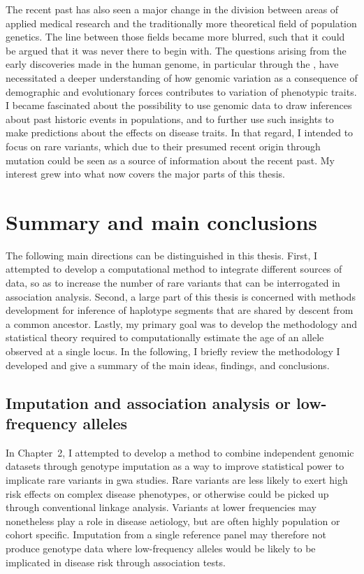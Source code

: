 The recent past has also seen a major change in the division between areas of applied medical research and the traditionally more theoretical field of population genetics.
The line between those fields became more blurred, such that it could be argued that it was never there to begin with.
The questions arising from the early discoveries made in the human genome, in particular through the  \citep{IntHumGenSeqCon:2001hk,IntHumGenSeqCon:2004bm}, have necessitated a deeper understanding of how genomic variation as a consequence of demographic and evolutionary forces contributes to variation of phenotypic traits.
I became fascinated about the possibility to use genomic data to draw inferences about past historic events in populations, and to further use such insights to make predictions about the effects on disease traits.
In that regard, I intended to focus on rare variants, which due to their presumed recent origin through mutation could be seen as a source of information about the recent past.
My interest grew into what now covers the major parts of this thesis.






\section{Summary and main conclusions}


The following main directions can be distinguished in this thesis.
First, I attempted to develop a computational method to integrate different sources of data, so as to increase the number of rare variants that can be interrogated in association analysis.
Second, a large part of this thesis is concerned with methods development for inference of haplotype segments that are shared by descent from a common ancestor.
Lastly, my primary goal was to develop the methodology and statistical theory required to computationally estimate the age of an allele observed at a single locus.
In the following, I briefly review the methodology I developed and give a summary of the main ideas, findings, and conclusions.


\subsection{Imputation and association analysis or low-frequency alleles}

In Chapter~2, I attempted to develop a method to combine independent genomic datasets through genotype imputation as a way to improve statistical power to implicate rare variants in \gls{gwa} studies.
Rare variants are less likely to exert high risk effects on complex disease phenotypes, or otherwise could be picked up through conventional linkage analysis.
Variants at lower frequencies may nonetheless play a role in disease aetiology, but are often  highly population or cohort specific.
Imputation from a single reference panel may therefore not produce genotype data where low-frequency alleles would be likely to be implicated in disease risk through association tests.

